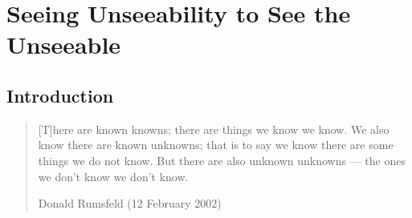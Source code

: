 \chapter{Seeing Unseeability to See the Unseeable}

\section{Introduction}
\label{sec:introduction}

\begin{quote}
  [T]here are known knowns; there are things we know we know.
  We also know there are known unknowns; that is to say we know there are some
  things we do not know.
  But there are also unknown unknowns --- the ones we don't know we don't know.
  \par\vspace*{-3ex}
  \begin{flushright}
    Donald Rumsfeld (12 February 2002)
  \end{flushright}
  \par\vspace*{-4ex}
\end{quote}

